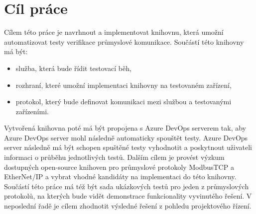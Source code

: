 \chapter{Cíl práce}
Cílem této práce je navrhnout a implementovat knihovnu, která umožní automatizovat testy verifikace průmyslové komunikace. 
Součástí této knihovny má být:
\begin{itemize}
    \item služba, která bude řídit testovací běh,
    \item rozhraní, které umožní implementaci knihovny na testovaném zařízení,
    \item protokol, který bude definovat komunikaci mezi službou a testovanými zařízeními.
\end{itemize}
Vytvořená knihovna poté má být propojena s Azure DevOps serverem tak, aby Azure DevOps server mohl následně automaticky spouštět testy. Azure DevOps server následně má být schopen spuštěné testy vyhodnotit a poskytnout uživateli informaci o průběhu jednotlivých testů. 
Dalším cílem je provést výzkum dostupných open-source knihoven pro průmyslové protokoly ModbusTCP a EtherNet/IP a vybrat vhodné kandidáty na implementaci do této knihovny. 
Součástí této práce má též být sada ukázkových testů pro jeden z průmyslových protokolů, na kterých bude 
vidět demonstrace funkcionality vyvinutého řešení. V neposlední řadě je cílem zhodnotit výsledné řešení z 
pohledu projektového řízení.